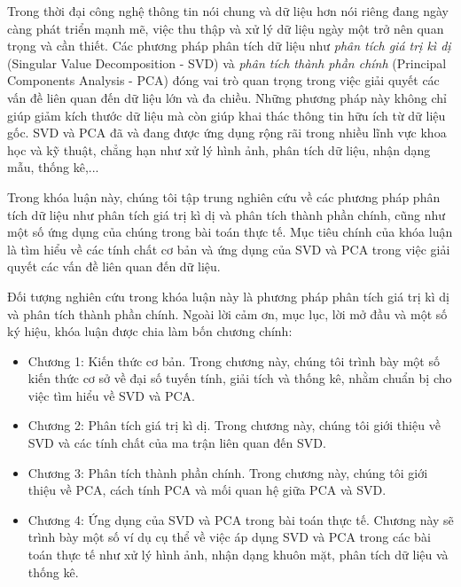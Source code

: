 \documentclass[12pt,a4paper,oneside]{report}
\numberwithin{equation}{section}
\begin{document}
\begin{justify}   
Trong thời đại công nghệ thông tin nói chung và dữ liệu hơn nói riêng đang ngày càng phát triển mạnh mẽ, việc thu thập và xử lý dữ liệu ngày một trở nên quan trọng và cần thiết. Các phương pháp phân tích dữ liệu như\textit{ phân tích giá trị kì dị} (Singular Value Decomposition - SVD) và \textit{phân tích thành phần chính} (Principal Components Analysis - PCA) đóng vai trò quan trọng trong việc giải quyết các vấn đề liên quan đến dữ liệu lớn và đa chiều. Những phương pháp này không chỉ giúp giảm kích thước dữ liệu mà còn giúp khai thác thông tin hữu ích từ dữ liệu gốc. SVD và PCA đã và đang được ứng dụng rộng rãi trong nhiều lĩnh vực khoa học và kỹ thuật, chẳng hạn như xử lý hình ảnh, phân tích dữ liệu, nhận dạng mẫu, thống kê,...

Trong khóa luận này, chúng tôi tập trung nghiên cứu về các phương pháp phân tích dữ liệu như phân tích giá trị kì dị và phân tích thành phần chính, cũng như một số ứng dụng của chúng trong bài toán thực tế. Mục tiêu chính của khóa luận là tìm hiểu về các tính chất cơ bản và ứng dụng của SVD và PCA trong việc giải quyết các vấn đề liên quan đến dữ liệu.

Đối tượng nghiên cứu trong khóa luận này là phương pháp phân tích giá trị kì dị và phân tích thành phần chính. Ngoài lời cảm ơn, mục lục, lời mở đầu và một số ký hiệu, khóa luận được chia làm bốn chương chính:
\begin{itemize}
\item Chương 1: Kiến thức cơ bản. Trong chương này, chúng tôi trình bày một số kiến thức cơ sở về đại số tuyến tính, giải tích và thống kê, nhằm chuẩn bị cho việc tìm hiểu về SVD và PCA.

\item Chương 2: Phân tích giá trị kì dị. Trong chương này, chúng tôi giới thiệu về SVD và các tính chất của ma trận liên quan đến SVD.

\item Chương 3: Phân tích thành phần chính. Trong chương này, chúng tôi giới thiệu về PCA, cách tính PCA và mối quan hệ giữa PCA và SVD.

\item Chương 4: Ứng dụng của SVD và PCA trong bài toán thực tế. Chương này sẽ trình bày một số ví dụ cụ thể về việc áp dụng SVD và PCA trong các bài toán thực tế như xử lý hình ảnh, nhận dạng khuôn mặt, phân tích dữ liệu và thống kê.
\end{itemize}
%
\end{justify}
\end{document}
